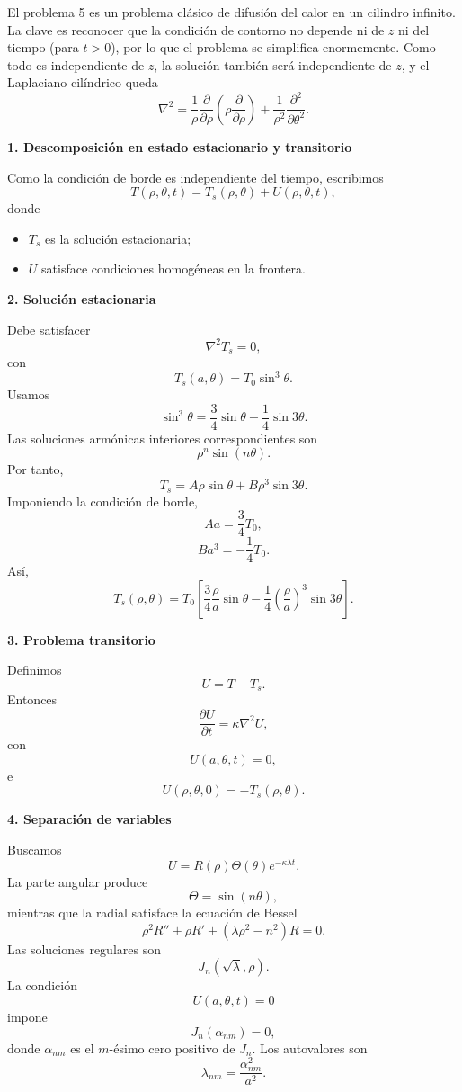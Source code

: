 \documentclass[11pt,spanish]{article}
\newcounter{problema}
\newcounter{solucion}
\newcommand{\solu}[1]{
	\vspace{.5cm} 
	\noindent{ \bf Soluci\'on {\em \arabic{problema}#1)} }
	\vspace{.3cm} 
	
}
\begin{document}
\solu{}

El problema 5 es un problema clásico de difusión del calor en un cilindro infinito. La clave es reconocer que la condición de contorno no depende ni de $z$ ni del tiempo (para $t>0$), por lo que el problema se simplifica enormemente. 
Como todo es independiente de $z$, la solución también será independiente de $z$, y el Laplaciano cilíndrico queda
$$
\nabla^2
=
\frac1\rho\frac{\partial}{\partial\rho}
\left(
\rho\frac{\partial}{\partial\rho}
\right)
+
\frac1{\rho^2}
\frac{\partial^2}{\partial\theta^2}.
$$

{\bf 1. Descomposición en estado estacionario y transitorio}

Como la condición de borde es independiente del tiempo, escribimos
$$
T(\rho,\theta,t)
=
T_s(\rho,\theta)
+
U(\rho,\theta,t),
$$
donde
\begin{itemize}
\item $T_s$ es la solución estacionaria;
\item $U$ satisface condiciones homogéneas en la frontera.
\end{itemize}

{\bf 2. Solución estacionaria}

Debe satisfacer
$$
\nabla^2T_s=0,
$$
con
$$
T_s(a,\theta)
=
T_0\sin^3\theta.
$$
Usamos
$$
\boxed{
\sin^3\theta
=
\frac34\sin\theta
-
\frac14\sin3\theta.
}
$$
Las soluciones armónicas interiores correspondientes son
$$
\rho^n\sin(n\theta).
$$
Por tanto,
$$
T_s
=
A\rho\sin\theta
+
B\rho^3\sin3\theta.
$$
Imponiendo la condición de borde,
$$
Aa=\frac34T_0,
$$
$$
Ba^3=-\frac14T_0.
$$
Así,
$$
\boxed{
T_s(\rho,\theta)
=
T_0
\left[
\frac34
\frac{\rho}{a}
\sin\theta
-
\frac14
\left(\frac{\rho}{a}\right)^3
\sin3\theta
\right].
}
$$

{\bf 3. Problema transitorio}

Definimos
$$
U=T-T_s.
$$
Entonces
$$
\frac{\partial U}{\partial t}
=
\kappa\nabla^2U,
$$
con
$$
U(a,\theta,t)=0,
$$
e
$$
U(\rho,\theta,0)
=
-
T_s(\rho,\theta).
$$

{\bf 4. Separación de variables}

Buscamos
$$
U
=
R(\rho)\Theta(\theta)e^{-\kappa\lambda t}.
$$
La parte angular produce
$$
\Theta=\sin(n\theta),
$$
mientras que la radial satisface la ecuación de Bessel
$$
\rho^2R''
+\rho R'
+
(\lambda\rho^2-n^2)R
=
0.
$$
Las soluciones regulares son
$$
J_n(\sqrt\lambda,\rho).
$$
La condición
$$
U(a,\theta,t)=0
$$
impone
$$
J_n(\alpha_{nm})=0,
$$
donde $\alpha_{nm}$ es el $m$-ésimo cero positivo de $J_n$.
Los autovalores son
$$
\lambda_{nm}
=
\frac{\alpha_{nm}^2}{a^2}.
$$
\end{document}
